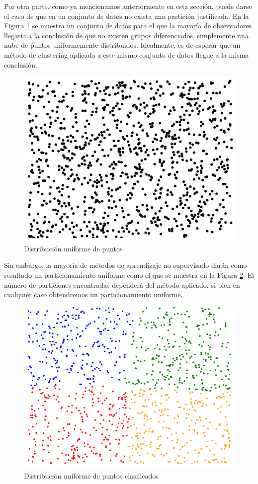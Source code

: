 Por otra parte, como ya mencionamos anteriormente en esta sección, puede darse el caso de que en un conjunto de datos no exista una partición justificada. En la Figura \ref{fig:figure2} se muestra un conjunto de datos para el que la mayoría de observadores llegaría a la conclusión de que no existen grupos diferenciados, simplemente una nube de puntos uniformemente distribuidos. Idealmente, es de esperar que un método de clustering aplicado a este mismo conjunto de datos llegue a la misma conclusión.

\begin{figure}[!h]
	\centering
	\includegraphics[scale=0.2]{imagenes/c2/rand.png} 
	\caption{Distribución uniforme de puntos}\label{fig:figure2}
\end{figure}

Sin embargo, la mayoría de métodos de aprendizaje no supervisado darán como resultado un particionamiento uniforme como el que se muestra en la Figura \ref{fig:figure3}. El número de particiones encontradas dependerá del método aplicado, si bien en cualquier caso obtendremos un particionamiento uniforme.

\begin{figure}[!h]
	\centering
	\includegraphics[scale=0.2]{imagenes/c2/randClasif.png} 
	\caption{Distribución uniforme de puntos clasificados}\label{fig:figure3}
\end{figure}


